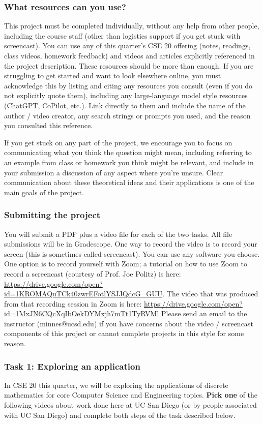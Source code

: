 \subsubsection*{What resources can you use?} This project must be completed individually, 
without any help from other people, including the course staff (other than logistics support if 
you get stuck with screencast).
You can use any of this quarter's CSE 20 offering (notes, readings, class videos, homework feedback)
and videos and articles explicitly referenced in the project description. 
These resources should be more than enough.
If you are struggling to get started and want to look elsewhere online, 
you must acknowledge this by listing and citing any resources you consult 
(even if you do not explicitly quote them), including any large-language model style resources (ChatGPT, CoPilot, etc.). 
Link directly to them and include the name of the author / video creator, 
any search strings or prompts you used, and the reason you consulted this reference.

If you get stuck on any part of the project, we encourage you to focus on communicating what you think 
the question might mean, including referring to an example from class or homework you think might be relevant, 
and include in your submission a discussion of any aspect where you're unsure. Clear communication about these
theoretical ideas and their applications is one of the main goals of the project.

\subsubsection*{Submitting the project} You will submit a PDF plus a video file for each of the 
two tasks. All file submissions will be in Gradescope. 
One way to record the video is to record your screen (this is sometimes called screencast).
You can use any software you choose. 
One option is to record yourself with Zoom; a tutorial on how to use Zoom to record a 
screencast (courtesy of Prof. Joe Politz)  is here: 
\url{https://drive.google.com/open?id=1KROMAQuTCk40zwrEFotlYSJJQdcG_GUU}.
The video that was produced from that recording session in Zoom is here:
\url{https://drive.google.com/open?id=1MxJN6CQcXqIbOekDYMxjh7mTt1TyRVMl}
Please send an email to the instructor (minnes@ucsd.edu) if you have 
concerns about  the video / screencast components of this project or cannot 
complete projects in this style for some reason.

\subsubsection*{Task 1: Exploring an application}
In CSE 20 this quarter, we will be exploring the applications of discrete mathematics for core Computer
Science and Engineering topics. {\bf Pick one} of the following videos about work done 
here at UC San Diego (or by people associated with UC San Diego) and complete both steps of 
the task described below.


